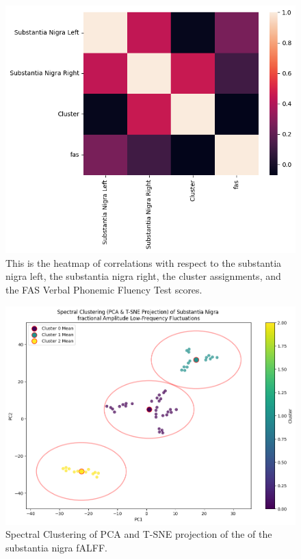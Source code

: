 \documentclass[12pt]{article}
\begin{document}
\newpage

\begin{figure}[h]  %
    \centering
    \includegraphics[width=\textwidth]{"../img/fALFF_SN_fas_test_correlation_heatmap.png"}  %
    \caption{This is the heatmap of correlations with respect to the substantia nigra left, the substantia nigra right, the cluster assignments, and the FAS Verbal Phonemic Fluency Test scores.}
    \label{fig:heatmap}  %
\end{figure}

\begin{figure}[h]  %
    \centering
    \includegraphics[width=\textwidth]{"../img/fALFF_SN_Spectral_Clustering.png"}  %
    \caption{Spectral Clustering of PCA and T-SNE projection of the of the substantia nigra fALFF.}
    \label{fig:clustering}  %
\end{figure}
\end{document}
